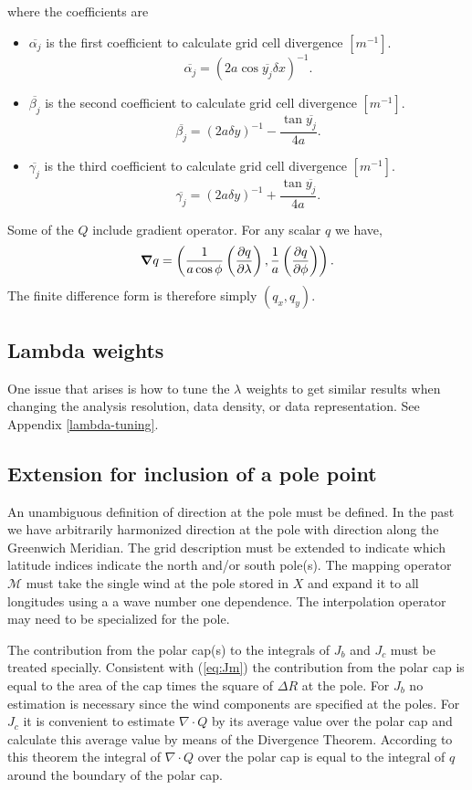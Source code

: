 \documentclass[11pt]{article}
\newcommand{\Dot}[2]{\Vector{{#1} \cdot {#2}}}
\newcommand{\gl}[1]{\mbox{$ \lambda_{#1} $}}
\newcommand{\J}[1]{\mbox{$ J_{#1} $}}
\newcommand{\Vector}[1]{\mbox{\boldmath ${#1}$}}
\newcommand{\xxx}[1]{\subsection {#1}}
\newcommand{\eql}[2]{\begin{equation} \label{eq:#1} #2 \end{equation}}
\newcommand{\eqr}[1]{(\ref{eq:#1})}
\newcommand{\vardef}[3]{\item $ {#1} $ is the {#2} $ [{#3}] $. }
\newcommand{\Operator}[1]{\mbox{$ \mathcal #1 $}}
\newcommand{\DpDp}[2]{ \frac{\partial #1}{\partial #2} }
\begin{document}
 where the coefficients are \begin{itemize}
  \vardef{\overline{\alpha_j}}{first coefficient to calculate grid cell divergence}{m^{-1}}
   \eql{alphaj}{\overline{\alpha_j} = (2 a \cos \overline{y_j} \delta x)^{-1} . }
  \vardef{\overline{\beta_j}}{second coefficient to calculate grid cell divergence}{m^{-1}}
   \eql{betaj}{\overline{\beta_j} = (2 a \delta y)^{-1} - \frac{\tan \overline{y_j}}{4 a} . }
  \vardef{\overline{\gamma_j}}{third coefficient to calculate grid cell divergence}{m^{-1}}
   \eql{gammaj}{\overline{\gamma_j} = (2 a \delta y)^{-1} + \frac{\tan \overline{y_j}}{4 a} . }
 \end{itemize} 

Some of the \Vector{Q} include gradient operator.  For any scalar $q$
we have,
 \eql{grad}{ \Vector{\nabla} q = \left(
  \frac{1}{a \cos \phi} \left( \DpDp{q}{\lambda} \right) ,
  \frac{1}{a} \left( \DpDp{q}{\phi} \right) \right) . }
 The finite difference form is therefore simply $ (q_x, q_y) $.

\xxx {Lambda weights}

One issue that arises is how to tune the \gl{} weights to get similar
results when changing the analysis resolution, data density, or data
representation.   See Appendix \ref{lambda-tuning}.

\xxx {Extension for inclusion of a pole point}

An unambiguous definition of direction at the pole must be defined.
In the past we have arbitrarily harmonized direction at the pole with
direction along the Greenwich Meridian.  The grid description must be
extended to indicate which latitude indices indicate the north and/or
south pole(s).  The mapping operator \Operator{M} must take the single
wind at the pole stored in \Vector{X} and expand it to all longitudes
using a a wave number one dependence.  The interpolation operator may
need to be specialized for the pole.

The contribution from the polar cap(s) to the integrals of \J{b} and
\J{c} must be treated specially.  Consistent with \eqr{Jm} the
contribution from the polar cap is equal to the area of the cap times
the square of $ \Delta R $ at the pole.  For \J{b} no estimation is
necessary since the wind components are specified at the poles.  For
\J{c} it is convenient to estimate \Dot{\nabla}{Q} by its average
value over the polar cap and calculate this average value by means of
the Divergence Theorem.  According to this theorem the integral of
\Dot{\nabla}{Q} over the polar cap is equal to the integral of $q$
around the boundary of the polar cap.
\end{document}
